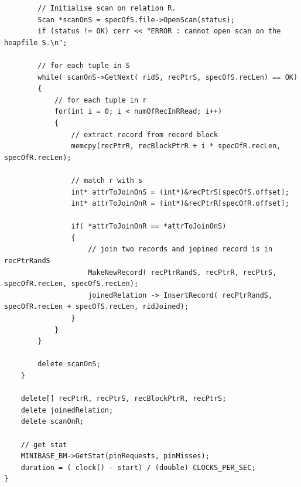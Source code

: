 \documentclass{article}
\begin{document}
\begin{lstlisting}
		// Initialise scan on relation R.
		Scan *scanOnS = specOfS.file->OpenScan(status);
		if (status != OK) cerr << "ERROR : cannot open scan on the heapfile S.\n";		

		// for each tuple in S
		while( scanOnS->GetNext( ridS, recPtrS, specOfS.recLen) == OK)
		{
			// for each tuple in r
			for(int i = 0; i < numOfRecInRRead; i++)
			{
				// extract record from record block
				memcpy(recPtrR, recBlockPtrR + i * specOfR.recLen, specOfR.recLen);

				// match r with s
				int* attrToJoinOnS = (int*)&recPtrS[specOfS.offset];
				int* attrToJoinOnR = (int*)&recPtrR[specOfR.offset];
				
				if( *attrToJoinOnR == *attrToJoinOnS)
				{
					// join two records and jopined record is in recPtrRandS
					MakeNewRecord( recPtrRandS, recPtrR, recPtrS, specOfR.recLen, specOfS.recLen);	
					joinedRelation -> InsertRecord( recPtrRandS, specOfR.recLen + specOfS.recLen, ridJoined);
				}
			}
		}

		delete scanOnS;
	}

	delete[] recPtrR, recPtrS, recBlockPtrR, recPtrS;
	delete joinedRelation;
	delete scanOnR;

	// get stat
	MINIBASE_BM->GetStat(pinRequests, pinMisses);
	duration = ( clock() - start) / (double) CLOCKS_PER_SEC;
}
\end{lstlisting}

\newpage
\end{document}
